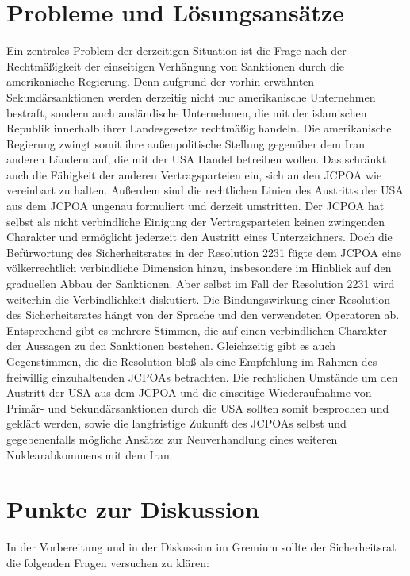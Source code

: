 \documentclass[a4paper,11pt]{article}
\begin{document}
    
    \section{Probleme und Lösungsansätze}
Ein zentrales Problem der derzeitigen Situation ist die Frage nach der Rechtmäßigkeit der einseitigen Verhängung von Sanktionen durch die amerikanische Regierung. Denn aufgrund der vorhin erwähnten Sekundärsanktionen werden derzeitig nicht nur amerikanische Unternehmen bestraft, sondern auch ausländische Unternehmen, die mit der islamischen Republik innerhalb ihrer Landesgesetze rechtmäßig handeln. Die amerikanische Regierung zwingt somit ihre außenpolitische Stellung gegenüber dem Iran anderen Ländern auf, die mit der USA Handel betreiben wollen. Das schränkt auch die Fähigkeit der anderen Vertragsparteien ein, sich an den JCPOA wie vereinbart zu halten. Außerdem sind die rechtlichen Linien des Austritts der USA aus dem JCPOA ungenau formuliert und derzeit umstritten. Der JCPOA hat selbst als nicht verbindliche Einigung der Vertragsparteien keinen zwingenden Charakter und ermöglicht jederzeit den Austritt eines Unterzeichners. Doch die Befürwortung des Sicherheitsrates in der Resolution 2231 fügte dem JCPOA eine völkerrechtlich verbindliche Dimension hinzu, insbesondere im Hinblick auf den graduellen Abbau der Sanktionen. Aber selbst im Fall der Resolution 2231 wird weiterhin die Verbindlichkeit diskutiert. Die Bindungswirkung einer Resolution des Sicherheitsrates hängt von der Sprache und den verwendeten Operatoren ab. Entsprechend gibt es mehrere Stimmen, die auf einen verbindlichen Charakter der Aussagen zu den Sanktionen bestehen. Gleichzeitig gibt es auch Gegenstimmen, die die Resolution bloß als eine Empfehlung im Rahmen des freiwillig einzuhaltenden JCPOAs betrachten. Die rechtlichen Umstände um den Austritt der USA aus dem JCPOA und die einseitige Wiederaufnahme von Primär- und Sekundärsanktionen durch die USA sollten somit besprochen und geklärt werden, sowie die langfristige Zukunft des JCPOAs selbst und gegebenenfalls mögliche Ansätze zur Neuverhandlung eines weiteren Nuklearabkommens mit dem Iran.
      
    \section{Punkte zur Diskussion}

In der Vorbereitung und in der Diskussion im Gremium sollte der Sicherheitsrat die folgenden Fragen versuchen zu klären: \\
\end{document}
